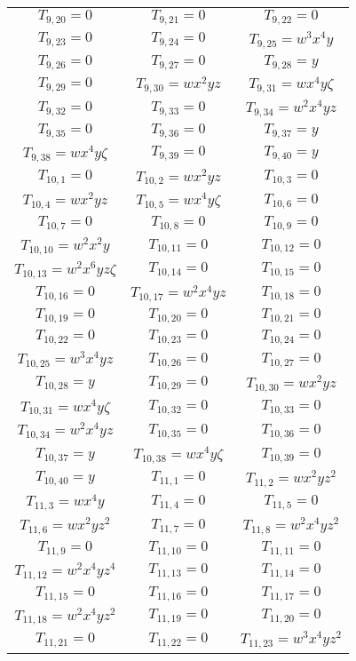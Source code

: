 \documentclass[12pt]{memoireuqam1.3}
\begin{document}
\begin{longtable}{|c|c|c|}
$T_{9,20}= 0$&
$T_{9,21}= 0$&
$T_{9,22}= 0$\\
$T_{9,23}= 0$&
$T_{9,24}= 0$&
$T_{9,25}= w^3x^4y$\\
$T_{9,26}= 0$&
$T_{9,27}= 0$&
$T_{9,28}= y$\\
$T_{9,29}= 0$&
$T_{9,30}= wx^2yz$&
$T_{9,31}= wx^4y\zeta$\\
$T_{9,32}= 0$&
$T_{9,33}= 0$&
$T_{9,34}= w^2x^4yz$\\
$T_{9,35}= 0$&
$T_{9,36}= 0$&
$T_{9,37}= y$\\
$T_{9,38}= wx^4y\zeta$&
$T_{9,39}= 0$&
$T_{9,40}= y$\\
$T_{10,1}= 0$&
$T_{10,2}= wx^2yz$&
$T_{10,3}= 0$\\
$T_{10,4}= wx^2yz$&
$T_{10,5}= wx^4y\zeta$&
$T_{10,6}= 0$\\
$T_{10,7}= 0$&
$T_{10,8}= 0$&
$T_{10,9}= 0$\\
$T_{10,10}= w^2x^2y$&
$T_{10,11}= 0$&
$T_{10,12}= 0$\\
$T_{10,13}= w^2x^6yz\zeta$&
$T_{10,14}= 0$&
$T_{10,15}= 0$\\
$T_{10,16}= 0$&
$T_{10,17}= w^2x^4yz$&
$T_{10,18}= 0$\\
$T_{10,19}= 0$&
$T_{10,20}= 0$&
$T_{10,21}= 0$\\
$T_{10,22}= 0$&
$T_{10,23}= 0$&
$T_{10,24}= 0$\\
$T_{10,25}= w^3x^4yz$&
$T_{10,26}= 0$&
$T_{10,27}= 0$\\
$T_{10,28}= y$&
$T_{10,29}= 0$&
$T_{10,30}= wx^2yz$\\
$T_{10,31}= wx^4y\zeta$&
$T_{10,32}= 0$&
$T_{10,33}= 0$\\
$T_{10,34}= w^2x^4yz$&
$T_{10,35}= 0$&
$T_{10,36}= 0$\\
$T_{10,37}= y$&
$T_{10,38}= wx^4y\zeta$&
$T_{10,39}= 0$\\
$T_{10,40}= y$&
$T_{11,1}= 0$&
$T_{11,2}= wx^2yz^2$\\
$T_{11,3}= wx^4y$&
$T_{11,4}= 0$&
$T_{11,5}= 0$\\
$T_{11,6}= wx^2yz^2$&
$T_{11,7}= 0$&
$T_{11,8}= w^2x^4yz^2$\\
$T_{11,9}= 0$&
$T_{11,10}= 0$&
$T_{11,11}= 0$\\
$T_{11,12}= w^2x^4yz^4$&
$T_{11,13}= 0$&
$T_{11,14}= 0$\\
$T_{11,15}= 0$&
$T_{11,16}= 0$&
$T_{11,17}= 0$\\
$T_{11,18}= w^2x^4yz^2$&
$T_{11,19}= 0$&
$T_{11,20}= 0$\\
$T_{11,21}= 0$&
$T_{11,22}= 0$&
$T_{11,23}= w^3x^4yz^2$\\

\end{longtable}
\end{document}
